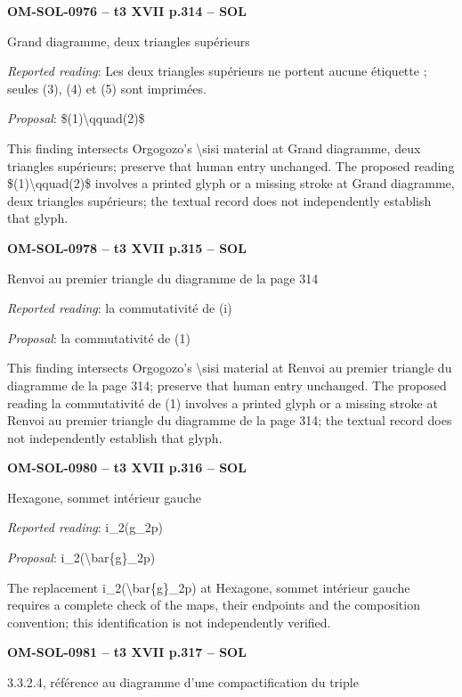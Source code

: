 \par\noindent\textbf{OM-SOL-0976 -- t3 XVII p.314 -- SOL}\par
Grand diagramme, deux triangles supérieurs\par
\emph{Reported reading}: Les deux triangles supérieurs ne portent aucune étiquette ; seules (3), (4) et (5) sont imprimées.\par
\emph{Proposal}: \$(1)\textbackslash{}qquad(2)\$\par
This finding intersects Orgogozo's \textbackslash{}sisi material at Grand diagramme, deux triangles supérieurs; preserve that human entry unchanged. The proposed reading \$(1)\textbackslash{}qquad(2)\$ involves a printed glyph or a missing stroke at Grand diagramme, deux triangles supérieurs; the textual record does not independently establish that glyph.\par
\par\noindent\textbf{OM-SOL-0978 -- t3 XVII p.315 -- SOL}\par
Renvoi au premier triangle du diagramme de la page 314\par
\emph{Reported reading}: la commutativité de (i)\par
\emph{Proposal}: la commutativité de (1)\par
This finding intersects Orgogozo's \textbackslash{}sisi material at Renvoi au premier triangle du diagramme de la page 314; preserve that human entry unchanged. The proposed reading la commutativité de (1) involves a printed glyph or a missing stroke at Renvoi au premier triangle du diagramme de la page 314; the textual record does not independently establish that glyph.\par
\par\noindent\textbf{OM-SOL-0980 -- t3 XVII p.316 -- SOL}\par
Hexagone, sommet intérieur gauche\par
\emph{Reported reading}: i\_2(g\_2p)\par
\emph{Proposal}: i\_2(\textbackslash{}bar\{g\}\_2p)\par
The replacement i\_2(\textbackslash{}bar\{g\}\_2p) at Hexagone, sommet intérieur gauche requires a complete check of the maps, their endpoints and the composition convention; this identification is not independently verified.\par
\par\noindent\textbf{OM-SOL-0981 -- t3 XVII p.317 -- SOL}\par
3.3.2.4, référence au diagramme d'une compactification du triple\par
